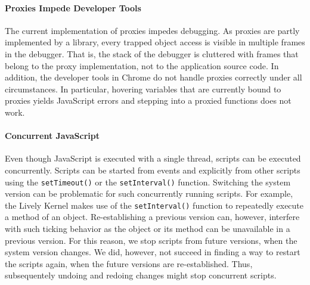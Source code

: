 \paragraph{Proxies Impede Developer Tools}
The current implementation of proxies impedes debugging.
As proxies are partly implemented by a library, every trapped object access is visible in multiple frames in the debugger.
That is, the stack of the debugger is cluttered with frames that belong to the proxy implementation, not to the application source code.
In addition, the developer tools in Chrome do not handle proxies correctly under all circumstances.
In particular, hovering variables that are currently bound to proxies yields JavaScript errors and stepping into a proxied functions does not work.

\paragraph{Concurrent JavaScript}
Even though JavaScript is executed with a single thread, scripts can be executed concurrently.
Scripts can be started from events and explicitly from other scripts using the \lstinline{setTimeout()} or the \lstinline{setInterval()} function.
Switching the system version can be problematic for such concurrently running scripts.
For example, the Lively Kernel makes use of the \lstinline{setInterval()} function to repeatedly execute a method of an object.
Re-establishing a previous version can, however, interfere with such ticking behavior as the object or its method can be unavailable in a previous version.
For this reason, we stop scripts from future versions, when the system version changes.
We did, however, not succeed in finding a way to restart the scripts again, when the future versions are re-established.
Thus, subsequentely undoing and redoing changes might stop concurrent scripts.



